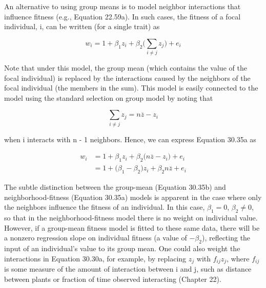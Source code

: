 \documentclass{article}
\begin{document}
An alternative to using group means is to model neighbor interactions that influence fitness (e.g., Equation 22.59a). In such cases, the fitness of a focal individual, i, can be written (for a single trait) as

\begin{equation}
w_{i}=1+\beta_{1}z_{i}+\beta_{2}\Big(\sum_{i\neq j}z_{j}\Big)+e_{i}
\tag{30.35a}
\label{eq:30_35a}
\end{equation}

Note that under this model, the group mean (which contains the value of the focal individual) is replaced by the interactions caused by the neighbors of the focal individual (the members in the sum). This model is easily connected to the model using the standard selection on group model by noting that

\begin{equation}
\sum_{i\neq j}z_{j}=n\overline{z}-z_{i}
\end{equation}

when i interacts with n - 1 neighbors. Hence, we can express Equation 30.35a as

\begin{equation}
\begin{aligned}w_{i}&=1+\beta_{1}z_{i}+\beta_{2}\Big(n\overline{z}-z_{i}\Big)+e_{i}\\&=1+\big(\beta_{1}-\beta_{2}\big)z_{i}+\beta_{2}n\overline{z}+e_{i}\end{aligned}
\tag{30.35b}
\label{eq:30_35b}
\end{equation}

The subtle distinction between the group-mean (Equation 30.35b) and neighborhood-fitness (Equation 30.35a) models is apparent in the case where only the neighbors influence the fitness of an individual. In this case,  $ \beta_1 = 0 $,  $ \beta_2 \neq 0 $, so that in the neighborhood-fitness model there is no weight on individual value. However, if a group-mean fitness model is fitted to these same data, there will be a nonzero regression slope on individual fitness (a value of  $ -\beta_2 $), reflecting the input of an individual's value to its group mean. One could also weight the interactions in Equation 30.30a, for example, by replacing  $ z_j $ with  $ f_{ij}z_j $, where  $ f_{ij} $ is some measure of the amount of interaction between i and j, such as distance between plants or fraction of time observed interacting (Chapter 22).
\end{document}
